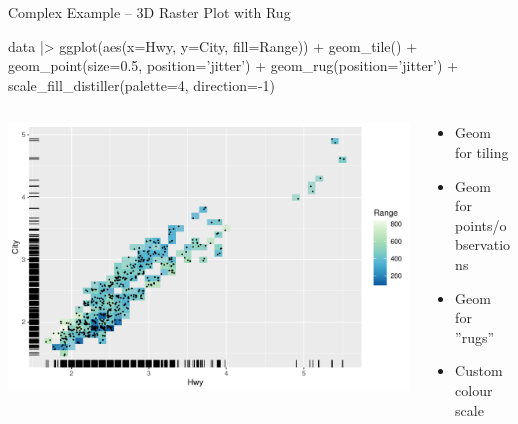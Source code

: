 \documentclass[ignorenonframetext,xcolor=x11names]{beamer}
\begin{document}
\begin{frame}[fragile]{Complex Example -- 3D Raster Plot with Rug}
\begin{Rcode}
data |>
  ggplot(aes(x=Hwy, y=City, fill=Range)) + 
    geom_tile() + 
    geom_point(size=0.5, position='jitter') +
    geom_rug(position='jitter') + 
    scale_fill_distiller(palette=4, direction=-1)
\end{Rcode}
\begin{columns}
\begin{column}{.65\textwidth}
  \includegraphics[width=\textwidth]{fuel.raster.rug.pdf}
\end{column}
\begin{column}{.35\textwidth}
\begin{itemize}
  \item Geom for tiling
  \item Geom for points/observations
  \item Geom for ''rugs''
  \item Custom colour scale
\end{itemize}
\end{column}
\end{columns}
\end{frame}
\end{document}
